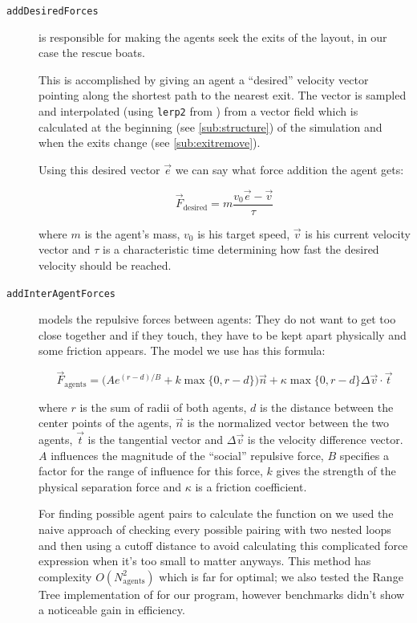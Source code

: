 \documentclass[11pt]{article}
\begin{document}
\begin{description}

\item[\texttt{addDesiredForces}] is responsible for making the agents seek the
exits of the layout, in our case the rescue boats.

This is accomplished by giving an agent a ``desired'' velocity vector pointing
along the shortest path to the nearest exit.  The vector is sampled and
interpolated (using \texttt{lerp2} from \cite{multilevel}) from a vector field
which is calculated at the beginning (see \ref{sub:structure}) of the
simulation and when the exits change (see \ref{sub:exitremove}).

Using this desired vector $\vec{e}$ we can say what force addition the agent gets:

\[ \vec{F}_\text{desired} = m \frac{v_0 \vec{e} - \vec{v}}{\tau} \]

where $m$ is the agent's mass, $v_0$ is his target speed, $\vec{v}$ is
his current velocity vector and $\tau$ is a characteristic time determining how
fast the desired velocity should be reached.

\item[\texttt{addInterAgentForces}] models the repulsive forces between agents:
They do not want to get too close together and if they touch, they have to be
kept apart physically and some friction appears.  The model we use has this
formula:

\[ \vec{F}_\text{agents} = \big(A e^{(r-d)/B} + k \max\{0, r-d\}\big) \vec{n} +
                     \kappa \max\{0, r-d\} \Delta \vec{v} \cdot \vec{t} \]

where $r$ is the sum of radii of both agents, $d$ is the distance between the
center points of the agents, $\vec{n}$ is the normalized vector between the two
agents, $\vec{t}$ is the tangential vector and $\Delta \vec{v}$ is the velocity
difference vector.  $A$ influences the magnitude of the ``social'' repulsive
force, $B$ specifies a factor for the range of influence for this force, $k$
gives the strength of the physical separation force and $\kappa$ is a friction
coefficient.

For finding possible agent pairs to calculate the function on we used the naive
approach of checking every possible pairing with two nested loops and then
using a cutoff distance to avoid calculating this complicated force expression
when it's too small to matter anyways.  This method has complexity
$O(N_\text{agents}^2)$ which is far for optimal; we also tested the Range Tree
implementation of \cite{multilevel} for our program, however benchmarks didn't
show a noticeable gain in efficiency.


\end{description}
\end{document}
